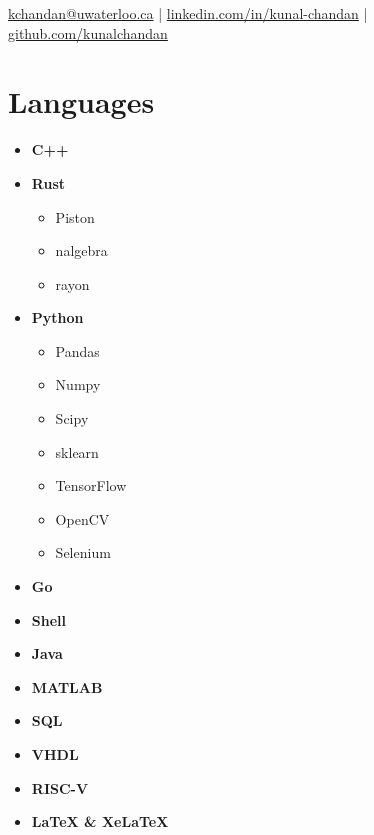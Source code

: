 \documentclass[]{chandan-cv}
\begin{document}
%
%

%
%
{
	\href{mailto:kchandan@uwaterloo.ca}{kchandan@uwaterloo.ca} \qquad
	| \qquad
	\href{https://www.linkedin.com/in/kunal-chandan/}{linkedin.com/in/kunal-chandan} \qquad
	| \qquad
	\href{http://github.com/kunalchandan}{github.com/kunalchandan}
}

%
%

\begin{minipage}[t]{0.23\textwidth}


\section{Languages}
	\begin{itemize}
		\setlength\itemsep{-0.2em}
		\item \textbf{C++}
		\item \textbf{Rust}
				\begin{itemize}
						\setlength\itemsep{-0.17em}
						\item Piston
						\item nalgebra
						\item rayon
				\end{itemize}
		\item \textbf{Python}
			\begin{itemize}
				\setlength\itemsep{-0.17em}
				\item Pandas
				\item Numpy
				\item Scipy
				\item sklearn
				\item TensorFlow
				\item OpenCV
				\item Selenium
			\end{itemize}
		\item \textbf{Go}
		\item \textbf{Shell}
		\item \textbf{Java}
		\item \textbf{MATLAB}
		\item \textbf{SQL}
		\item \textbf{VHDL}
		\item \textbf{RISC-V}
		\item \textbf{LaTeX \& XeLaTeX}
	\end{itemize}


\end{minipage}
\end{document}
